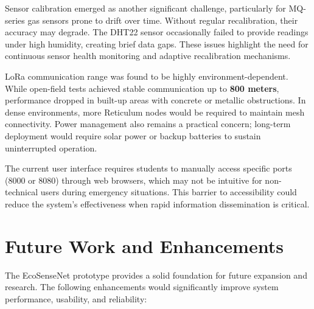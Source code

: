 Sensor calibration emerged as another significant challenge, particularly for MQ-series gas sensors prone to drift over time. Without regular recalibration, their accuracy may degrade. The DHT22 sensor occasionally failed to provide readings under high humidity, creating brief data gaps. These issues highlight the need for continuous sensor health monitoring and adaptive recalibration mechanisms.

LoRa communication range was found to be highly environment-dependent. While open-field tests achieved stable communication up to \textbf{800 meters}, performance dropped in built-up areas with concrete or metallic obstructions. In dense environments, more Reticulum nodes would be required to maintain mesh connectivity. Power management also remains a practical concern; long-term deployment would require solar power or backup batteries to sustain uninterrupted operation.

The current user interface requires students to manually access specific ports (8000 or 8080) through web browsers, which may not be intuitive for non-technical users during emergency situations. This barrier to accessibility could reduce the system's effectiveness when rapid information dissemination is critical.

\section{Future Work and Enhancements}
The EcoSenseNet prototype provides a solid foundation for future expansion and research. The following enhancements would significantly improve system performance, usability, and reliability:

